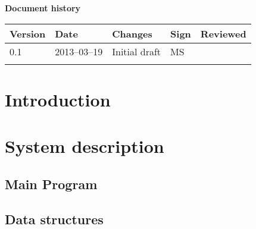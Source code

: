\documentclass[10pt, a4paper, twoside]{article}
\numberwithin{equation}{section}
\numberwithin{figure}{section}
\begin{document}



\newpage
\pagestyle{fancy}
\setcounter{page}{2} %




\newpage
\tableofcontents
\listoffigures



\newpage
\vspace*{5\baselineskip}

\begin{center}
\textbf{\LARGE Document history}

{ \footnotesize 
\begin{tabular}{|p{1cm}|p{2.0cm}|p{5cm}|p{1.5cm}|p{1.5cm}|}
	\hline
	\textbf{Version} & \textbf{Date} & \textbf{Changes} & \textbf{Sign} & \textbf{Reviewed} \\
	
	\hline
	0.1 & 2013--03--19 & Initial draft & MS & \\
	
	\hline
	 &  &  &  &  \\
	
	\hline
\end{tabular}
}
\end{center}





%
%
\newpage
{}

\newpage
\section{Introduction}


\section{System description}


\newpage
\subsection{Main Program}


\newpage
\subsection{Data structures}

\end{document}
